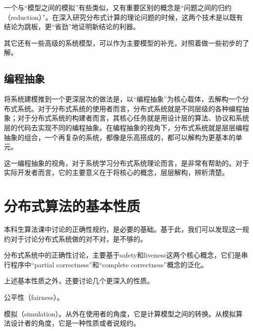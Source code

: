 \documentclass[UTF8]{ctexrep}
\begin{document}
一个与“模型之间的模拟”有些类似，又有重要区别的概念是“问题之间的归约（reduction）”。在深入研究分布式计算的理论问题的时候，这两个技术是以既有结论为跳板，更“省劲”地证明新结论的利器。

其它还有一些高级的系统模型，可以作为主要模型的补充，对照着做一些初步的了解。


\section{编程抽象}

将系统建模推到一个更深层次的做法是，以“编程抽象”为核心载体，去解构一个分布式系统。对于分布式系统的使用者而言，分布式系统就是不同层级的各种编程抽象；对于分布式系统的构建者而言，其核心任务就是用设计层的算法、协议和系统层的代码去实现不同的编程抽象。在编程抽象的视角下，分布式系统就是层层编程抽象的组合，一个再复杂的系统，都像是乐高搭成的，都可以解构为更基本的单元。

这一编程抽象的视角，对于系统学习分布式系统理论而言，是非常有帮助的。对于实际开发者而言，它的主要意义在于将核心的概念，层层解构，辨析清楚。



\chapter{分布式算法的基本性质}

本科生算法课中讨论的正确性规约，是必要的基础。基于此，我们可以发现这一规约对于讨论分布式系统做的对不对，是不够的。

分布式系统中的正确性讨论，主要基于safety和liveness这两个核心概念，它们是串行程序中“partial correctness”和“complete correctness”概念的泛化。


上述基本性质之外，还要讨论几个更深入的性质。

公平性（fairness）。

模拟（simulation）。从外在使用者的角度，它是计算模型之间的转换。从模拟算法设计者的角度，它是一种性质或者说规约。
\end{document}
